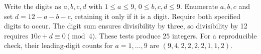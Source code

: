 Write the digits as $a,b,c,d$ with $1\le a\le9$, $0\le b,c,d\le9$. Enumerate $a,b,c$ and set $d=12-a-b-c$, retaining it only if it is a digit. Require both specified digits to occur. The digit sum ensures divisibility by three, so divisibility by 12 requires $10c+d\equiv0\pmod4$. These tests produce $\boxed{25}$ integers. For a reproducible check, their leading-digit counts for $a=1,\ldots,9$ are $(9,4,2,2,2,2,1,1,2)$.
